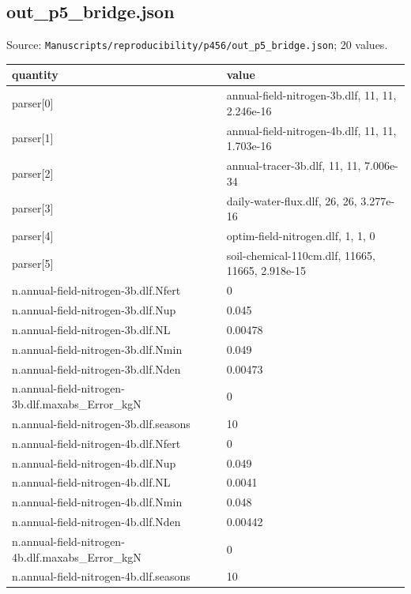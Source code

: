 \subsection*{out\_p5\_bridge.json}
\noindent\small Source: \nolinkurl{Manuscripts/reproducibility/p456/out_p5_bridge.json}; 20 values.\par
{\scriptsize\begin{longtable}{p{}p{}}\toprule\textbf{quantity} & \textbf{value}\\\midrule\endhead
{}parser[0] & annual-field-nitrogen-3b.dlf, 11, 11, 2.246e-16\\
{}parser[1] & annual-field-nitrogen-4b.dlf, 11, 11, 1.703e-16\\
{}parser[2] & annual-tracer-3b.dlf, 11, 11, 7.006e-34\\
{}parser[3] & daily-water-flux.dlf, 26, 26, 3.277e-16\\
{}parser[4] & optim-field-nitrogen.dlf, 1, 1, 0\\
{}parser[5] & soil-chemical-110cm.dlf, 11665, 11665, 2.918e-15\\
{}n.annual-field-nitrogen-3b.dlf.Nfert & 0\\
{}n.annual-field-nitrogen-3b.dlf.Nup & 0.045\\
{}n.annual-field-nitrogen-3b.dlf.NL & 0.00478\\
{}n.annual-field-nitrogen-3b.dlf.Nmin & 0.049\\
{}n.annual-field-nitrogen-3b.dlf.Nden & 0.00473\\
{}n.annual-field-nitrogen-3b.dlf.maxabs\_Error\_kgN & 0\\
{}n.annual-field-nitrogen-3b.dlf.seasons & 10\\
{}n.annual-field-nitrogen-4b.dlf.Nfert & 0\\
{}n.annual-field-nitrogen-4b.dlf.Nup & 0.049\\
{}n.annual-field-nitrogen-4b.dlf.NL & 0.0041\\
{}n.annual-field-nitrogen-4b.dlf.Nmin & 0.048\\
{}n.annual-field-nitrogen-4b.dlf.Nden & 0.00442\\
{}n.annual-field-nitrogen-4b.dlf.maxabs\_Error\_kgN & 0\\
{}n.annual-field-nitrogen-4b.dlf.seasons & 10\\
\bottomrule\end{longtable}}

